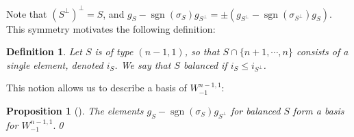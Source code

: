 \documentclass[pdflatex,sn-mathphys-num]{sn-jnl}%
\theoremstyle{thmstyleone}%
\newtheorem{proposition}[subsubsection]{Proposition}%
\theoremstyle{thmstyletwo}%
\numberwithin{equation}{subsection}
\theoremstyle{thmstylethree}%
\newtheorem{definition}[subsubsection]{Definition}%
\DeclareMathOperator{\sgn}{sgn}
\begin{document}
Note that $(S^\perp)^\perp=S$, and $g_S-\sgn(\sigma_S)g_{S^\perp}=\pm (g_{S^\perp}-\sgn(\sigma_{S^\perp})g_S)$. This symmetry motivates the following definition:
\begin{definition}
Let $S$ is of type $(n-1,1)$, so that $S\cap\{n+1,\cdots,n\}$ consists of a single element, denoted $i_S$.
We say that $S$ \emph{balanced} if $i_S\leq i_{S^\perp}$.
\end{definition}

This notion allows us to describe a basis of $W_{-1}^{n-1,1}$:
\begin{proposition}[]\label{equ_ss-comp:g_S-g-S-perp}
	The elements $g_S-\sgn(\sigma_S)g_{S^\perp}$ for balanced $S$ form a basis for $W^{n-1,1}_{-1}.$\qed
\end{proposition}
		
\end{document}
